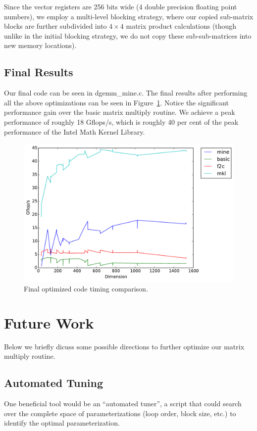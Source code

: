 \documentclass[fontsize=11pt]{scrartcl}
\numberwithin{equation}{section}        %
\numberwithin{figure}{section}          %
\numberwithin{table}{section}               %
\begin{document}
Since the vector registers are 256 bits wide (4 double precision floating point 
numbers), we employ a multi-level blocking strategy, where our copied sub-matrix 
blocks are further subdivided into $4 \times 4$ matrix product calculations 
(though unlike in the initial blocking strategy, we do not copy these 
sub-sub-matrices into new memory locations).

\subsection{Final Results}

Our final code can be seen in dgemm\_mine.c. The final results after performing 
all the above optimizations can be seen in Figure~\ref{fig:final}.  
Notice the significant performance gain over the basic
matrix multiply routine.  We achieve a peak performance of roughly 18 Gflops/s, 
which is roughly 40 per cent of the peak performance of the Intel Math Kernel
Library.

\begin{figure}[h]
    \centering
    \includegraphics[width=5.0in]{../final_timings/timing_104_4.pdf}
    \caption{Final optimized code timing comparison.}
    \label{fig:final}
\end{figure}

\section{Future Work}

Below we briefly dicuss some possible directions to further optimize our
matrix multiply routine.

\subsection{Automated Tuning}
One beneficial tool would be an ``automated tuner'', a script that could 
search over the complete space of parameterizations (loop order, block size, etc.)
to identify the optimal parameterization.
\end{document}
